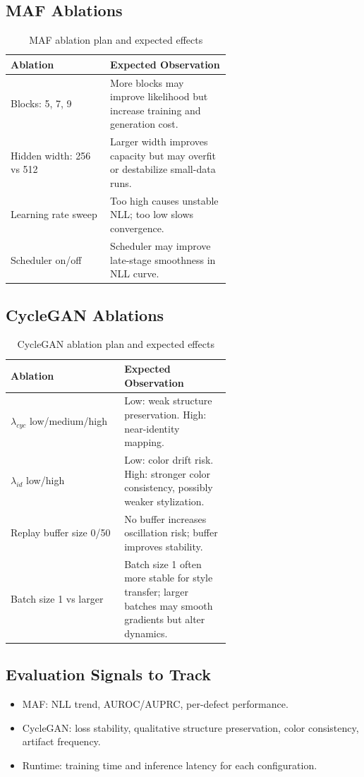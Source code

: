 \documentclass[conference]{IEEEtran}
\begin{document}
\subsection{MAF Ablations}
\begin{table}[!t]
\centering
\caption{MAF ablation plan and expected effects}
\begin{tabular}{|p{0.28\linewidth}|p{0.34\linewidth}|}
\hline
\textbf{Ablation} & \textbf{Expected Observation} \\
\hline
Blocks: 5, 7, 9 & More blocks may improve likelihood but increase training and generation cost. \\
\hline
Hidden width: 256 vs 512 & Larger width improves capacity but may overfit or destabilize small-data runs. \\
\hline
Learning rate sweep & Too high causes unstable NLL; too low slows convergence. \\
\hline
Scheduler on/off & Scheduler may improve late-stage smoothness in NLL curve. \\
\hline
\end{tabular}
\end{table}

\subsection{CycleGAN Ablations}
\begin{table}[!t]
\centering
\caption{CycleGAN ablation plan and expected effects}
\begin{tabular}{|p{0.28\linewidth}|p{0.34\linewidth}|}
\hline
\textbf{Ablation} & \textbf{Expected Observation} \\
\hline
$\lambda_{cyc}$ low/medium/high & Low: weak structure preservation. High: near-identity mapping. \\
\hline
$\lambda_{id}$ low/high & Low: color drift risk. High: stronger color consistency, possibly weaker stylization. \\
\hline
Replay buffer size 0/50 & No buffer increases oscillation risk; buffer improves stability. \\
\hline
Batch size 1 vs larger & Batch size 1 often more stable for style transfer; larger batches may smooth gradients but alter dynamics. \\
\hline
\end{tabular}
\end{table}

\subsection{Evaluation Signals to Track}
\begin{itemize}
\item MAF: NLL trend, AUROC/AUPRC, per-defect performance.
\item CycleGAN: loss stability, qualitative structure preservation, color consistency, artifact frequency.
\item Runtime: training time and inference latency for each configuration.
\end{itemize}
\end{document}
